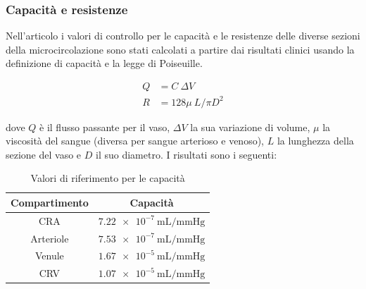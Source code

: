 \documentclass{article}
\begin{document}
\subsubsection*{Capacità e resistenze}
Nell'articolo \cite{Tesi} i valori di controllo per le capacità e le resistenze delle diverse sezioni della microcircolazione sono stati calcolati a partire dai risultati clinici usando la definizione di capacità e la legge di Poiseuille.
\begin{center}
\begin{equation}
\begin{split}
Q &= C \ \Delta V \\
R &= 128 \mu\ L / \pi D^2
\end{split}
\label{eqcapacity}
\end{equation}
\end{center}
dove $Q$ è il flusso passante per il vaso, $\Delta V$ la sua variazione di volume, $\mu$ la viscosità del sangue (diversa per sangue arterioso e venoso), $L$ la lunghezza della sezione del vaso e $D$ il suo diametro.
I risultati sono i seguenti:

\begin{table}[h!]
\begin{center}
\begin{tabular}{| c | c |}
\hline
\textbf{Compartimento} & \textbf{Capacità}\\
\hline
CRA & $ \SI{7.22e-7}{\milli \liter \per \mmHg}$ \\
Arteriole & $ \SI{7.53e-7}{\milli \liter \per \mmHg}$ \\
Venule & $\SI{1.67e-5}{\milli \liter \per \mmHg}$ \\
CRV & $\SI{1.07e-5}{\milli \liter \per \mmHg}$ \\
\hline
\end{tabular}
\caption{Valori di riferimento per le capacità}
\label{tab_capacita}
\end{center}
\end{table}
\end{document}
